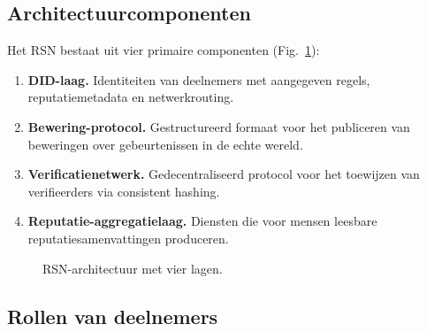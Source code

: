 \documentclass[11pt,a4paper,twocolumn]{article}
\begin{document}
\subsection{Architectuurcomponenten}

Het RSN bestaat uit vier primaire componenten (Fig.~\ref{fig:architecture}):
\begin{enumerate}[nosep]
\item \textbf{DID-laag.} Identiteiten van deelnemers met aangegeven regels, reputatiemetadata en netwerkrouting.
\item \textbf{Bewering-protocol.} Gestructureerd formaat voor het publiceren van beweringen over gebeurtenissen in de echte wereld.
\item \textbf{Verificatienetwerk.} Gedecentraliseerd protocol voor het toewijzen van verifieerders via consistent hashing.
\item \textbf{Reputatie-aggregatielaag.} Diensten die voor mensen leesbare reputatiesamenvattingen produceren.
\end{enumerate}

\begin{figure}[ht]
\centering
{}
\caption{RSN-architectuur met vier lagen.}
\label{fig:architecture}
\end{figure}

\subsection{Rollen van deelnemers}
\end{document}
